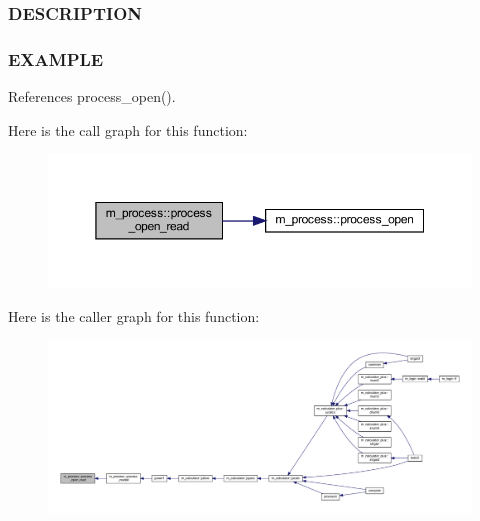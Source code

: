 \subsubsection*{D\+E\+S\+C\+R\+I\+P\+T\+I\+ON}

\subsubsection*{E\+X\+A\+M\+P\+LE}

References process\+\_\+open().

Here is the call graph for this function\+:
\nopagebreak
\begin{figure}[H]
\begin{center}
\leavevmode
\includegraphics[width=350pt]{namespacem__process_aaaf4d1926258a4cec7da7fc61c38c79d_cgraph}
\end{center}
\end{figure}
Here is the caller graph for this function\+:
\nopagebreak
\begin{figure}[H]
\begin{center}
\leavevmode
\includegraphics[width=350pt]{namespacem__process_aaaf4d1926258a4cec7da7fc61c38c79d_icgraph}
\end{center}
\end{figure}
\mbox{\label{namespacem__process_aa6ed1404ab3472f5068ed15a7a01defc}} 
